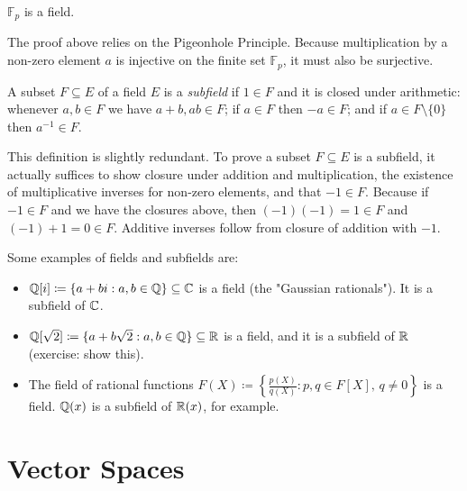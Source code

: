 \documentclass[../linear_algebra_and_groups.tex]{subfiles}
\begin{document}
\begin{corollary}
    \begin{shaded*}
        $\mathbb{F}_p$ is a field.
    \end{shaded*}
\end{corollary}

\begin{remark}
    The proof above relies on the Pigeonhole Principle. Because multiplication by a non-zero element $a$ is injective on the finite set $\mathbb{F}_p$, it must also be surjective.
\end{remark}

\begin{definition}[Subfield]
    \begin{shaded*}
        A subset $F\subseteq E$ of a field $E$ is a \textit{subfield} if $1\in F$ and it is closed under arithmetic: whenever $a,b\in F$ we have $a+b,ab\in F$; if $a\in F$ then $-a\in F$; and if $a\in F\setminus\{0\}$ then $a^{-1}\in F$.
    \end{shaded*}
\end{definition}

\begin{remark}
    This definition is slightly redundant. To prove a subset $F\subseteq E$ is a subfield, it actually suffices to show closure under addition and multiplication, the existence of multiplicative inverses for non-zero elements, and that $-1\in F$. Because if $-1\in F$ and we have the closures above, then $(-1)(-1)=1\in F$ and $(-1)+1=0\in F$. Additive inverses follow from closure of addition with $-1$.
\end{remark}

\begin{example}Some examples of fields and subfields are:
    \begin{itemize}
        \item $\mathbb{Q}[i]\coloneqq\{a+bi:a,b\in\mathbb{Q}\}\subseteq\mathbb{C}$ is a field (the "Gaussian rationals"). It is a subfield of $\mathbb{C}$.
        \item $\mathbb{Q}[\sqrt{2}]\coloneqq\{a+b\sqrt{2}:a,b\in\mathbb{Q}\}\subseteq\mathbb{R}$ is a field, and it is a subfield of $\mathbb{R}$ (exercise: show this).
        \item The field of rational functions $F(X)\coloneqq\left\{\frac{p(X)}{q(X)}:p,q\in F[X],\,q\ne 0\right\}$ is a field. $\mathbb{Q}(x)$ is a subfield of $\mathbb{R}(x)$, for example.
    \end{itemize}
\end{example}

\section{Vector Spaces}
\end{document}
